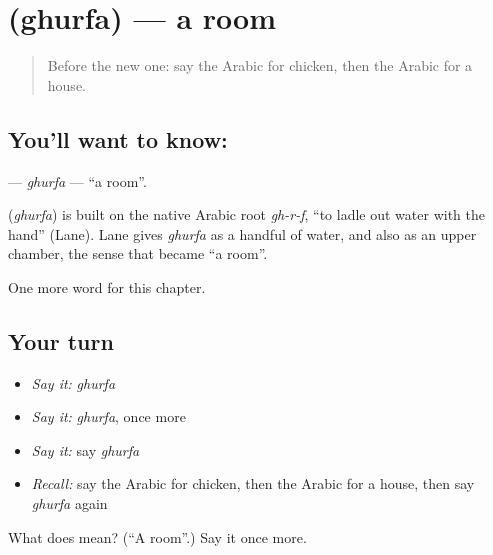 \section[\texorpdfstring{\ar{غرفة} (ghurfa)}{غرفة (ghurfa)}]{ (ghurfa) — a room}

\label{lesson:AR-C69-ghurfa}



\begin{quote}
Before the new one: say the Arabic for chicken, then the Arabic for a house.
\end{quote}

\subsection*{You'll want to know: }
\textbf{} — \emph{ghurfa} — \textquotedblleft{}a room\textquotedblright{}.

\begin{cousinweb}
\textbf{} (\emph{ghurfa}) is built on the native Arabic root \emph{gh-r-f}, \textquotedblleft{}to ladle out water with the hand\textquotedblright{} (Lane). Lane gives \emph{ghurfa} as a handful of water, and also as an upper chamber, the sense that became \textquotedblleft{}a room\textquotedblright{}.
\end{cousinweb}

\begin{grammarlens}[title={What you've built}]
One more word for this chapter.
\end{grammarlens}

\subsection*{Your turn}
\begin{itemize}
\raggedright
  \item \emph{Say it:} \emph{ghurfa}
  \item \emph{Say it:} \emph{ghurfa}, once more
  \item \emph{Say it:} say \emph{ghurfa}
  \item \emph{Recall:} say the Arabic for chicken, then the Arabic for a house, then say \emph{ghurfa} again
\end{itemize}

\begin{tcolorbox}[breakable,colback=teal!4,colframe=teal!35!black,title={Before you move on}]
What does  mean? (\textquotedblleft{}A room\textquotedblright{}.) Say it once more.
\end{tcolorbox}
